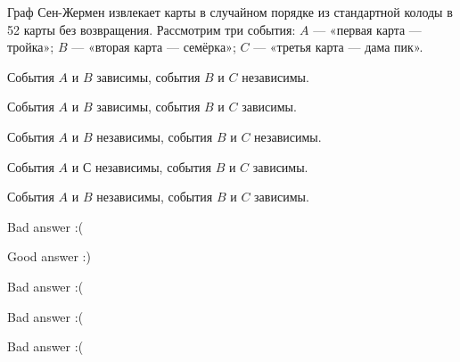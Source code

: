 
\begin{question}
Граф Сен-Жермен извлекает карты в случайном порядке из стандартной
колоды в 52 карты без возвращения. Рассмотрим три события: \(A\) ---
«первая карта — тройка»; \(B\) — «вторая карта — семёрка»; \(C\)
— «третья карта — дама пик».
\begin{answerlist}
  \item События \(A\) и \(B\) зависимы, события \(B\) и \(C\) независимы.
  \item События \(A\) и \(B\) зависимы, события \(B\) и \(C\) зависимы.
  \item События \(A\) и \(B\) независимы, события \(B\) и \(C\) независимы.
  \item События \(A\) и \(С\) независимы, события \(B\) и \(C\) зависимы.
  \item События \(A\) и \(B\) независимы, события \(B\) и \(C\) зависимы.
\end{answerlist}
\end{question}

\begin{solution}
\begin{answerlist}
  \item Bad answer :(
  \item Good answer :)
  \item Bad answer :(
  \item Bad answer :(
  \item Bad answer :(
\end{answerlist}
\end{solution}

